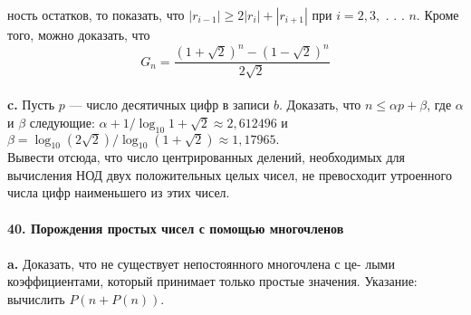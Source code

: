 \documentclass{mai_book}
\begin{document}
ность остатков, то показать, что $|r_{i-1}|\geq2|r_i|+|r_{i+1}|$ при $i = 2,3,$ . . . $n.$\linebreak
Кроме того, можно доказать, что
\begin{equation*}
G_n=\frac{(1+\sqrt{2})^n-(1-\sqrt{2})^n}{2\sqrt{2}}
\end{equation*}\\
\hspace*{10pt}\textbf{c.}  Пусть $p$ — число десятичных цифр в записи $b$. Доказать, что\linebreak
$n\leq \alpha p +\beta $, где $\alpha$ и $\beta$ следующие: $\alpha+1/\log_{10}{1+\sqrt{2}}\approx2,612496$ и\linebreak
$\beta = \log_{10}{(2\sqrt{2})}/\log_{10}{(1+\sqrt{2})} \approx 1,17965.$\\
\hspace*{10pt} Вывести отсюда, что число центрированных делений, необходимых\linebreak
для вычисления НОД двух положительных целых чисел, не превосходит\linebreak
утроенного числа цифр наименьшего из этих чисел.
\\
\\
\noindent\textbf{40. Порождения простых чисел с помощью многочленов}\\\\
\hspace*{10pt}\textbf{a.} Доказать, что не существует непостоянного многочлена с це-\linebreak
лыми коэффициентами, который принимает только простые значения.\linebreak
Указание: вычислить $P(n+P(n))$.\pagebreak

\end{document}
